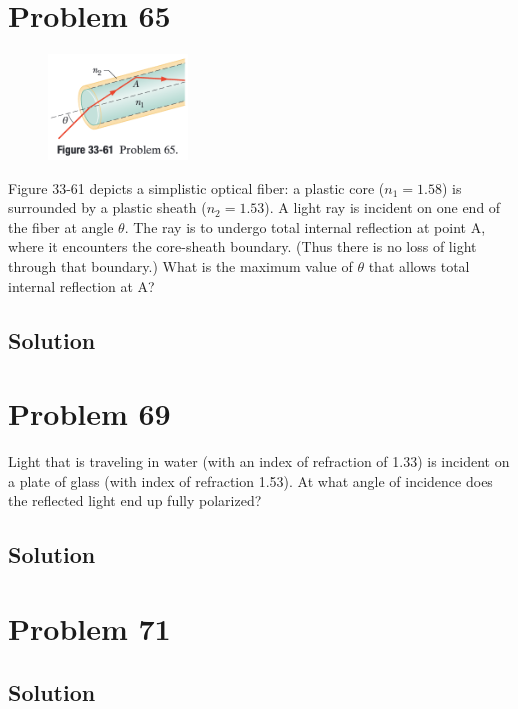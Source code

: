 \documentclass[12pt]{article}
\begin{document}
    \pagebreak
    \section{Problem 65}
        \begin{figure}
            \vspace{-30pt}
            \includegraphics[width=0.33\textwidth]{33-61.png} 
        \end{figure}
        Figure 33-61 depicts a simplistic optical fiber: a plastic core ($n_1 = 1.58$) is surrounded by a plastic sheath ($n_2 = 1.53$). 
        A light ray is incident on one end of the fiber at angle $\theta$. 
        The ray is to undergo total internal reflection at point A, where it encounters the core-sheath boundary. 
        (Thus there is no loss of light through that boundary.) 
        What is the maximum value of $\theta$ that allows total internal reflection at A?

        \subsection{Solution}

    \pagebreak
    \section{Problem 69}
        Light that is traveling in water (with an index of refraction of 1.33) is incident on a plate of glass (with index of refraction 1.53). 
        At what angle of incidence does the reflected light end up fully polarized?

        \subsection{Solution}

    \pagebreak
    \section{Problem 71}

        \subsection{Solution}
\end{document}
